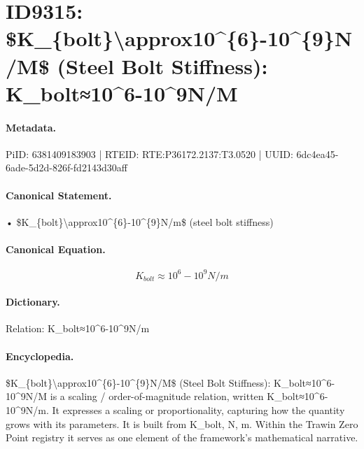 \section*{ID9315: \$K\_\{bolt\}\textbackslash{}approx10\textasciicircum{}\{6\}-10\textasciicircum{}\{9\}N/M\$ (Steel Bolt Stiffness): K\_bolt≈10\textasciicircum{}6-10\textasciicircum{}9N/M}
\paragraph{Metadata.}
PiID: 6381409183903 | RTEID: RTE:P36172.2137:T3.0520 | UUID: 6dc4ea45-6ade-5d2d-826f-fd2143d30aff

\paragraph{Canonical Statement.}
• \$K\_\{bolt\}\textbackslash{}approx10\textasciicircum{}\{6\}-10\textasciicircum{}\{9\}N/m\$ (steel bolt stiffness)

\paragraph{Canonical Equation.}
\[
K_{bolt}\approx10^{6}-10^{9}N/m
\]

\paragraph{Dictionary.}
Relation: K\_bolt≈10\textasciicircum{}6-10\textasciicircum{}9N/m

\paragraph{Encyclopedia.}
\$K\_\{bolt\}\textbackslash{}approx10\textasciicircum{}\{6\}-10\textasciicircum{}\{9\}N/M\$ (Steel Bolt Stiffness): K\_bolt≈10\textasciicircum{}6-10\textasciicircum{}9N/M is a scaling / order-of-magnitude relation, written K\_bolt≈10\textasciicircum{}6-10\textasciicircum{}9N/m. It expresses a scaling or proportionality, capturing how the quantity grows with its parameters. It is built from K\_bolt, N, m. Within the Trawin Zero Point registry it serves as one element of the framework's mathematical narrative.
